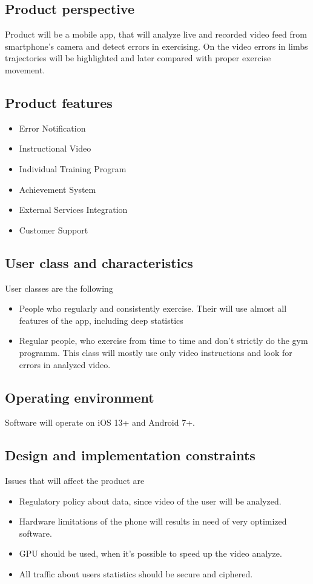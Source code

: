 \documentclass{article}
\begin{document}
\subsection{Product perspective}
Product will be a mobile app, that will analyze live and recorded video feed from smartphone's camera and detect errors in exercising. On the video errors in limbs trajectories will be highlighted and later compared with proper exercise movement. 

\subsection{Product features}

\begin{itemize}
	\item Error Notification
	\item Instructional Video
	\item Individual Training Program
	\item Achievement System
	\item External Services Integration
	\item Customer Support
\end{itemize}
\subsection{User class and characteristics}
User classes are the following
\begin{itemize}
	\item People who regularly and consistently exercise. Their will use almost all features of the app, including deep statistics
	\item Regular people, who exercise from time to time and don't strictly do the gym programm. This class will mostly use only video instructions and look for errors in analyzed video. 
\end{itemize}

\subsection{Operating environment}
Software will operate on iOS 13+ and Android 7+.

\subsection{Design and implementation constraints}
Issues that will affect the product are
\begin{itemize}
	\item Regulatory policy about data, since video of the user will be analyzed.
	\item Hardware limitations of the phone will results in need of very optimized software. 
	\item GPU should be used, when it's possible to speed up the video analyze.
	\item All traffic about users statistics should be secure and ciphered. 
\end{itemize}
\end{document}
